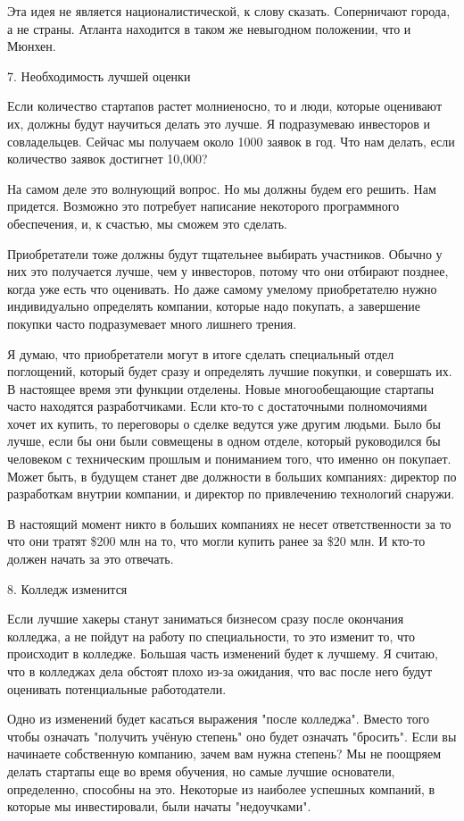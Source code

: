 \documentclass[ebook,12pt,oneside,openany]{memoir}
\begin{document}
Эта идея не является националистической, к слову сказать. Соперничают
города, а не страны. Атланта находится в таком же невыгодном
положении, что и Мюнхен.

7. Необходимость лучшей оценки

Если количество стартапов растет молниеносно, то и люди, которые
оценивают их, должны будут научиться делать это лучше. Я подразумеваю
инвесторов и совладельцев. Сейчас мы получаем около 1000 заявок в год.
Что нам делать, если количество заявок достигнет 10,000?

На самом деле это волнующий вопрос. Но мы должны будем его решить. Нам
придется. Возможно это потребует написание некоторого программного
обеспечения, и, к счастью, мы сможем это сделать.

Приобретатели тоже должны будут тщательнее выбирать участников. Обычно
у них это получается лучше, чем у инвесторов, потому что они отбирают
позднее, когда уже есть что оценивать. Но даже самому умелому
приобретателю нужно индивидуально определять компании, которые надо
покупать, а завершение покупки часто подразумевает много лишнего
трения.

Я думаю, что приобретатели могут в итоге сделать специальный отдел
поглощений, который будет сразу и определять лучшие покупки, и
совершать их. В настоящее время эти функции отделены. Новые
многообещающие стартапы часто находятся разработчиками. Если кто-то с
достаточными полномочиями хочет их купить, то переговоры о сделке
ведутся уже другим людьми. Было бы лучше, если бы они были совмещены в
одном отделе, который руководился бы человеком с техническим прошлым и
пониманием того, что именно он покупает. Может быть, в будущем станет
две должности в больших компаниях: директор по разработкам внутрии
компании, и директор по привлечению технологий снаружи.

В настоящий момент никто в больших компаниях не несет ответственности
за то что они тратят \$200 млн на то, что могли купить ранее за \$20
млн. И кто-то должен начать за это отвечать.

8. Колледж изменится

Если лучшие хакеры станут заниматься бизнесом сразу после окончания
колледжа, а не пойдут на работу по специальности, то это изменит то,
что происходит в колледже. Большая часть изменений будет к лучшему. Я
считаю, что в колледжах дела обстоят плохо из-за ожидания, что вас
после него будут оценивать потенциальные работодатели.

Одно из изменений будет касаться выражения "после колледжа". Вместо
того чтобы означать "получить учёную степень" оно будет означать
"бросить". Если вы начинаете собственную компанию, зачем вам нужна
степень? Мы не поощряем делать стартапы еще во время обучения, но
самые лучшие основатели, определенно, способны на это. Некоторые из
наиболее успешных компаний, в которые мы инвестировали, были начаты
"недоучками".
\end{document}
